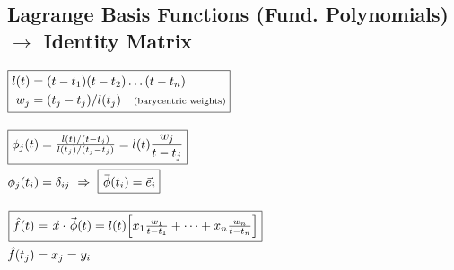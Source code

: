 \documentclass[12pt]{article}
\newcommand{\hs}{\hspace{1pt}}
\newcommand{\hsvec}[1]{\vec{\hs #1}}
\begin{document}
\subsection{Lagrange Basis Functions (Fund. Polynomials) \(\rightarrow\) Identity Matrix}

\vspace{5pt}
\(
    \begin{aligned}
        &\boxed{ 
            \begin{aligned}
                l(t) &= (t-t_1)(t-t_2)\dots(t-t_n)\\
                w_j &= (t_j - t_j) / l(t_j) \hspace{10pt} \text{\scriptsize(barycentric weights)}
            \end{aligned} 
        }
            \\[10pt]
        &\begin{aligned}
            \Aboxed{ \phi_j(t) &= \tfrac{ l(t) / (t-t_j) }{ l(t_j) / (t_j-t_j) } 
                = l(t) \frac{w_j}{t-t_j} }
                \\
            \phi_j(t_i) &= \delta_{ij} \ \Rightarrow \ \boxed{ \hsvec{\phi}(t_i) = \vec{e}_i }
        \end{aligned}
            \\[10pt]
        &\begin{aligned}
            \Aboxed{ \hat{f}(t) &= \hsvec{x} \cdot \hsvec{\phi}(t)
                = l(t) \Big[ x_1 \tfrac{w_1}{t-t_1} + \dots + x_n \tfrac{w_n}{t-t_n} \Big] }
                \\
            \hat{f}(t_j) &= x_j = y_i
        \end{aligned}
    \end{aligned}
\)
\hfill
\vline
\hfill
\end{document}
